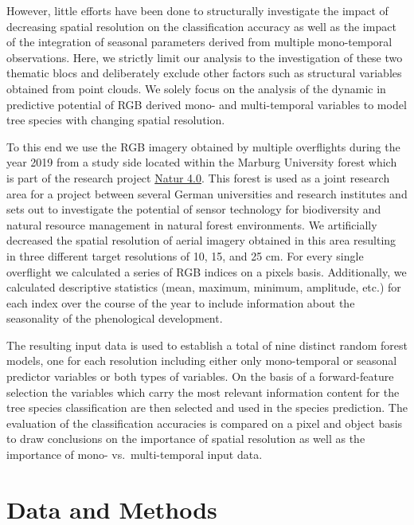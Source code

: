 \documentclass[]{article}
\begin{document}
However, little efforts have been done to structurally investigate the
impact of decreasing spatial resolution on the classification accuracy
as well as the impact of the integration of seasonal parameters derived
from multiple mono-temporal observations. Here, we strictly limit our
analysis to the investigation of these two thematic blocs and
deliberately exclude other factors such as structural variables obtained
from point clouds. We solely focus on the analysis of the dynamic in
predictive potential of RGB derived mono- and multi-temporal variables
to model tree species with changing spatial resolution.

To this end we use the RGB imagery obtained by multiple overflights
during the year 2019 from a study side located within the Marburg
University forest which is part of the research project
\href{https://www.uni-marburg.de/en/fb19/natur40/}{Natur 4.0}. This
forest is used as a joint research area for a project between several
German universities and research institutes and sets out to investigate
the potential of sensor technology for biodiversity and natural resource
management in natural forest environments. We artificially decreased the
spatial resolution of aerial imagery obtained in this area resulting in
three different target resolutions of 10, 15, and 25 cm. For every
single overflight we calculated a series of RGB indices on a pixels
basis. Additionally, we calculated descriptive statistics (mean,
maximum, minimum, amplitude, etc.) for each index over the course of the
year to include information about the seasonality of the phenological
development.

The resulting input data is used to establish a total of nine distinct
random forest models, one for each resolution including either only
mono-temporal or seasonal predictor variables or both types of
variables. On the basis of a forward-feature selection the variables
which carry the most relevant information content for the tree species
classification are then selected and used in the species prediction. The
evaluation of the classification accuracies is compared on a pixel and
object basis to draw conclusions on the importance of spatial resolution
as well as the importance of mono- vs.~multi-temporal input data.

\hypertarget{data-and-methods}{%
\section{Data and Methods}\label{data-and-methods}}
\end{document}
